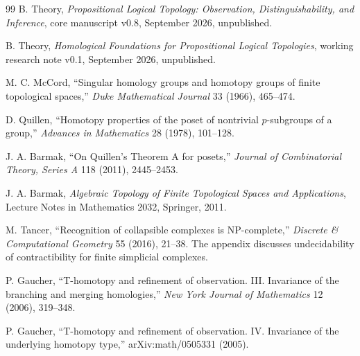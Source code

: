 \documentclass[11pt]{article}
\theoremstyle{definition}
\begin{document}
\begin{thebibliography}{99}
B. Theory,
\emph{Propositional Logical Topology: Observation, Distinguishability, and Inference},
core manuscript v0.8, September 2026, unpublished.

B. Theory,
\emph{Homological Foundations for Propositional Logical Topologies},
working research note v0.1, September 2026, unpublished.

M. C. McCord,
``Singular homology groups and homotopy groups of finite topological spaces,''
\emph{Duke Mathematical Journal} 33 (1966), 465--474.

D. Quillen,
``Homotopy properties of the poset of nontrivial \(p\)-subgroups of a group,''
\emph{Advances in Mathematics} 28 (1978), 101--128.

J. A. Barmak,
``On Quillen's Theorem A for posets,''
\emph{Journal of Combinatorial Theory, Series A} 118 (2011), 2445--2453.

J. A. Barmak,
\emph{Algebraic Topology of Finite Topological Spaces and Applications},
Lecture Notes in Mathematics 2032, Springer, 2011.

M. Tancer,
``Recognition of collapsible complexes is NP-complete,''
\emph{Discrete \& Computational Geometry} 55 (2016), 21--38.
The appendix discusses undecidability of contractibility for finite simplicial complexes.

P. Gaucher,
``T-homotopy and refinement of observation. III. Invariance of the branching and merging homologies,''
\emph{New York Journal of Mathematics} 12 (2006), 319--348.

P. Gaucher,
``T-homotopy and refinement of observation. IV. Invariance of the underlying homotopy type,''
arXiv:math/0505331 (2005).

\end{thebibliography}
\end{document}
